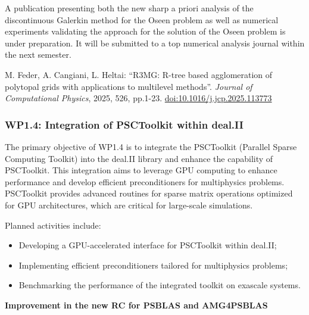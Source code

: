 \documentclass[a4paper,12pt, numbers]{article}
\begin{document}
A publication presenting both the new sharp a priori analysis of the discontinuous Galerkin method for the Oseen problem as well as numerical experiments validating the approach for the solution of the Oseen problem is under preparation. It will be submitted to a top numerical analysis journal within the next semester.

\begin{thebibliography}{10}
 M. Feder, A. Cangiani, L. Heltai: ``R3MG: R-tree based agglomeration of polytopal grids with applications to multilevel methods''. \emph{Journal of Computational Physics}, 2025, 526,
pp.1-23. \href{https://doi.org/10.1016/j.jcp.2025.113773}{doi:10.1016/j.jcp.2025.113773}
\end{thebibliography}


\subsubsection*{WP1.4: Integration of PSCToolkit within deal.II} %

The primary objective of WP1.4 is to integrate the PSCToolkit (Parallel Sparse Computing Toolkit) into the deal.II library and enhance the capability of PSCToolkit. This integration aims to leverage GPU computing to enhance performance and develop efficient preconditioners for multiphysics problems. PSCToolkit provides advanced routines for sparse matrix operations optimized for GPU architectures, which are critical for large-scale simulations.

Planned activities include:
\begin{itemize}
\item Developing a GPU-accelerated interface for PSCToolkit within deal.II;
\item Implementing efficient preconditioners tailored for multiphysics problems;
\item Benchmarking the performance of the integrated toolkit on exascale systems.
\end{itemize}

\noindent\textbf{Improvement in the new RC for PSBLAS and AMG4PSBLAS}
\end{document}
